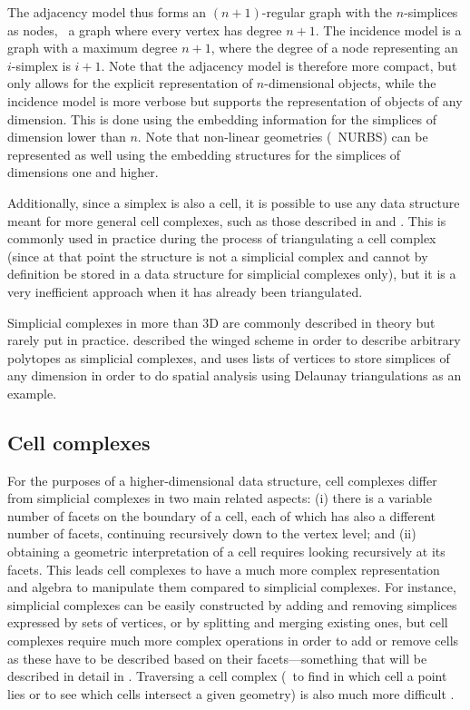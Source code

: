 The adjacency model thus forms an $(n+1)$-regular graph with the $n$-simplices as nodes, \ie\ a graph where every vertex has degree $n+1$.
The incidence model is a graph with a maximum degree $n+1$, where the degree of a node representing an $i$-simplex is $i+1$.
Note that the adjacency model is therefore more compact, but only allows for the explicit representation of $n$-dimensional objects, while the incidence model is more verbose but supports the representation of objects of any dimension.
This is done using the embedding information for the simplices of dimension lower than $n$.
Note that non-linear geometries (\eg\ NURBS) can be represented as well using the embedding structures for the simplices of dimensions one and higher.

Additionally, since a simplex is also a cell, it is possible to use any data structure meant for more general cell complexes, such as those described in  and .
This is commonly used in practice during the process of triangulating a cell complex (since at that point the structure is not a simplicial complex and cannot by definition be stored in a data structure for simplicial complexes only), but it is a very inefficient approach when it has already been triangulated.

Simplicial complexes in more than 3D are commonly described in theory but rarely put in practice.
\citet{Paoluzzi93} described the winged scheme in order to describe arbitrary polytopes as simplicial complexes, and \citet{Karimipour10} uses lists of vertices to store simplices of any dimension in order to do spatial analysis using Delaunay triangulations as an example.

\subsection{Cell complexes}
\label{ss:cell-complexes}

For the purposes of a higher-dimensional data structure, cell complexes differ from simplicial complexes in two main related aspects: (i) there is a variable number of facets on the boundary of a cell, each of which has also a different number of facets, continuing recursively down to the vertex level; and (ii) obtaining a geometric interpretation of a cell requires looking recursively at its facets.
This leads cell complexes to have a much more complex representation and algebra to manipulate them compared to simplicial complexes.
For instance, simplicial complexes can be easily constructed by adding and removing simplices expressed by sets of vertices, or by splitting and merging existing ones, but cell complexes require much more complex operations in order to add or remove cells as these have to be described based on their facets---something that will be described in detail in .
Traversing a cell complex (\eg\ to find in which cell a point lies or to see which cells intersect a given geometry) is also much more difficult \citep{deBerg97}.


